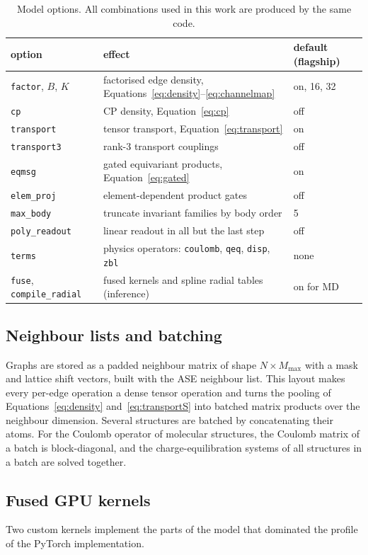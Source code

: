 \documentclass[journal=jctcce,manuscript=article,layout=traditional]{achemso}
\begin{document}
\begin{table}
\caption{Model options. All combinations used in this work are produced by the same code.}
\label{tab:options}
\small
\begin{tabular}{lll}
\toprule
option & effect & default (flagship) \\
\midrule
\texttt{factor}, $B$, $K$ & factorised edge density, Equations~\ref{eq:density}--\ref{eq:channelmap} & on, 16, 32 \\
\texttt{cp} & CP density, Equation~\ref{eq:cp} & off \\
\texttt{transport} & tensor transport, Equation~\ref{eq:transport} & on \\
\texttt{transport3} & rank-3 transport couplings & off \\
\texttt{eqmsg} & gated equivariant products, Equation~\ref{eq:gated} & on \\
\texttt{elem\_proj} & element-dependent product gates & off \\
\texttt{max\_body} & truncate invariant families by body order & 5 \\
\texttt{poly\_readout} & linear readout in all but the last step & off \\
\texttt{terms} & physics operators: \texttt{coulomb}, \texttt{qeq}, \texttt{disp}, \texttt{zbl} & none \\
\texttt{fuse}, \texttt{compile\_radial} & fused kernels and spline radial tables (inference) & on for MD \\
\bottomrule
\end{tabular}
\end{table}

\subsection{Neighbour lists and batching}
Graphs are stored as a padded neighbour matrix of shape $N\times M_\text{max}$ with a mask and lattice shift
vectors, built with the ASE neighbour list. This layout makes every per-edge operation a dense tensor operation and
turns the pooling of Equations~\ref{eq:density} and~\ref{eq:transportS} into batched matrix products over the neighbour
dimension. Several structures are batched by concatenating their atoms. For the Coulomb operator of molecular
structures, the Coulomb matrix of a batch is block-diagonal, and the charge-equilibration systems of all structures
in a batch are solved together.

\subsection{Fused GPU kernels}
Two custom kernels implement the parts of the model that dominated the profile of the PyTorch implementation.
\end{document}
